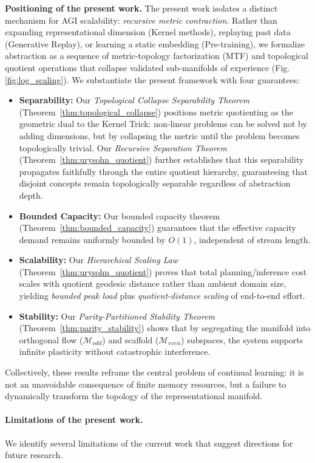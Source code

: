 \documentclass{article}
\begin{document}
\noindent\textbf{Positioning of the present work.}
The present work isolates a distinct mechanism for AGI scalability: \emph{recursive metric contraction}.
Rather than expanding representational dimension (Kernel methods), replaying past data (Generative Replay), or learning a static embedding (Pre-training), we formalize abstraction as a sequence of metric-topology factorization (MTF) and topological quotient operations that collapse validated sub-manifolds of experience (Fig. \ref{fig:log_scaling}).
We substantiate the present framework with four guarantees:
\begin{itemize}
    \item \textbf{Separability:} Our \emph{Topological Collapse Separability Theorem} (Theorem~\ref{thm:topological_collapse}) positions metric quotienting as the geometric dual to the Kernel Trick: non-linear problems can be solved not by adding dimensions, but by collapsing the metric until the problem becomes topologically trivial. Our \emph{Recursive Separation Theorem} (Theorem~\ref{thm:urysohn_quotient}) further establishes that this separability propagates faithfully through the entire quotient hierarchy, guaranteeing that disjoint concepts remain topologically separable regardless of abstraction depth.
    \item \textbf{Bounded Capacity:} Our bounded capacity theorem (Theorem~\ref{thm:bounded_capacity}) guarantees that the effective capacity demand remains uniformly bounded by $O(1)$, independent of stream length.
    \item \textbf{Scalability:} Our \emph{Hierarchical Scaling Law} (Theorem~\ref{thm:urysohn_quotient}) proves that total planning/inference cost scales with quotient geodesic distance rather than ambient domain size, yielding \emph{bounded peak load} plus \emph{quotient-distance scaling} of end-to-end effort.
    \item \textbf{Stability:} Our \emph{Parity-Partitioned Stability Theorem} (Theorem~\ref{thm:parity_stability}) shows that by segregating the manifold into orthogonal flow ($\mathcal{M}_{odd}$) and scaffold ($\mathcal{M}_{even}$) subspaces, the system supports infinite plasticity without catastrophic interference.
\end{itemize}
\noindent
Collectively, these results reframe the central problem of continual learning: it is not an unavoidable consequence of finite memory resources, but a failure to dynamically transform the topology of the representational manifold.

\paragraph{Limitations of the present work.}
We identify several limitations of the current work that suggest directions for future research.
\end{document}
